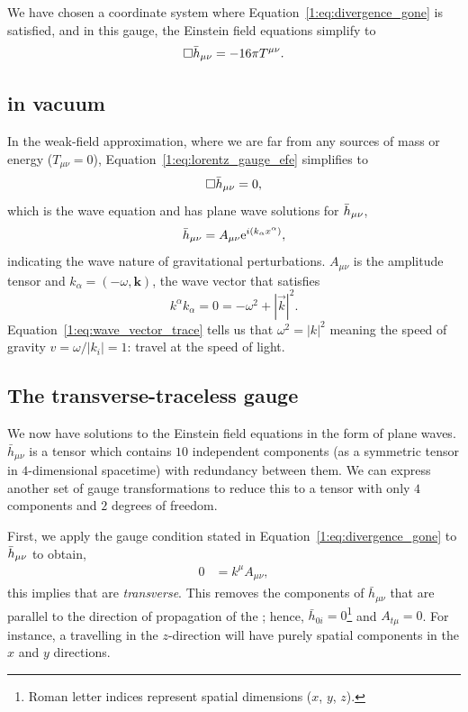 We have chosen a coordinate system where Equation~\ref{1:eq:divergence_gone} is satisfied, and in this gauge, the Einstein field equations simplify to
%
\begin{equation}
    \Box \Bar{h}_{\mu\nu} = -16 \pi T^{\mu\nu} .
    \label{1:eq:lorentz_gauge_efe}
\end{equation}
%

\subsection{\label{1:sec:gw_in_vacuum}\Gws in vacuum}

In the weak-field approximation, where we are far from any sources of mass or energy ($T_{\mu\nu} = 0$), Equation~\ref{1:eq:lorentz_gauge_efe} simplifies to
%
\begin{equation}
    \Box \Bar{h}_{\mu\nu} = 0,
\end{equation}
%
which is the wave equation and has plane wave solutions for $\Bar{h}_{\mu\nu}$,
%
\begin{equation}
    \Bar{h}_{\mu\nu} = A_{\mu\nu} {\rm e}^{i(k_\alpha x^\alpha)},
\end{equation}
%
indicating the wave nature of gravitational perturbations. $A_{\mu\nu}$ is the amplitude tensor and $k_\alpha = (-\omega, \textbf{k})$, the wave vector that satisfies
%
\begin{equation}
    k^{\alpha} k_{\alpha} = 0 = -\omega^{2} + |\vec{k}|^{2}.
    \label{1:eq:wave_vector_trace}
\end{equation}
%
Equation~\ref{1:eq:wave_vector_trace} tells us that $\omega^{2} = |k|^{2}$ meaning the speed of gravity $v = \omega / |k_{i}| = 1$: \gws travel at the speed of light. 

\subsection{\label{1:sec:TT_gauge}The transverse-traceless gauge}

We now have solutions to the Einstein field equations in the form of plane waves. $\bar{h}_{\mu\nu}$ is a tensor which contains $10$ independent components (as a symmetric tensor in $4$-dimensional spacetime) with redundancy between them. We can express another set of gauge transformations to reduce this to a tensor with only $4$ components and $2$ degrees of freedom.

First, we apply the gauge condition stated in Equation~\ref{1:eq:divergence_gone} to $\Bar{h}_{\mu\nu}$ to obtain,
%
\begin{align}
    0 &= k^{\mu} A_{\mu\nu},
\end{align}
%
this implies that \gws are \textit{transverse}. This removes the components of $\bar{h}_{\mu\nu}$ that are parallel to the direction of propagation of the \gw; hence, $\bar{h}_{0i} = 0$\footnote{Roman letter indices represent spatial dimensions ($x$, $y$, $z$).} and $A_{t\mu} = 0$. For instance, a \gw travelling in the $z$-direction will have purely spatial components in the $x$ and $y$ directions.

